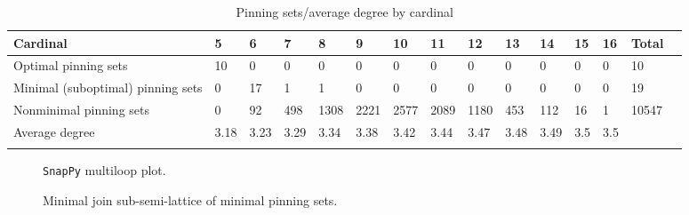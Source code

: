 \documentclass{article}%
\begin{document}
\begin{table}[ht]
	\caption{Pinning sets/average degree by cardinal}
	\centering
	\renewcommand{\arraystretch}{1.5}
	\begin{tabularx}{\textwidth}{lXXXXXXXXXXXXXX}
		\toprule
			Cardinal & 5 & 6 & 7 & 8 & 9 & 10 & 11 & 12 & 13 & 14 & 15 & 16 & Total\\
			\hline
			Optimal pinning sets & 10 & 0 & 0 & 0 & 0 & 0 & 0 & 0 & 0 & 0 & 0 & 0 & 10 \\
			Minimal (suboptimal) pinning sets & 0 & 17 & 1 & 1 & 0 & 0 & 0 & 0 & 0 & 0 & 0 & 0 & 19 \\
			Nonminimal pinning sets & 0 & 92 & 498 & 1308 & 2221 & 2577 & 2089 & 1180 & 453 & 112 & 16 & 1 & 10547 \\
			Average degree & 3.18 & 3.23 & 3.29 & 3.34 & 3.38 & 3.42 & 3.44 & 3.47 & 3.48 & 3.49 & 3.5 & 3.5 &  \\
		\bottomrule \\ 
	\end{tabularx}
\end{table}

\begin{multicols}{2}
\begin{figure}[H]
\centering

\caption{\texttt{SnapPy} multiloop plot.}
\label{fig:tex/img/[[19, 28, 20, 1], [9, 18, 10, 19], [6, 27, 7, 28], [20, 7, 21, 8], [1, 8, 2, 9], [22, 17, 23, 18], [10, 23, 11, 24], [5, 14, 6, 15], [26, 13, 27, 14], [21, 3, 22, 2], [16, 11, 17, 12], [24, 16, 25, 15.svg}
\end{figure}
\columnbreak

\begin{figure}[H]
\centering
\scalebox{0.8}{}
\caption{Minimal join sub-semi-lattice of minimal pinning sets.}
\label{fig:tex/img/[[19, 28, 20, 1], [9, 18, 10, 19], [6, 27, 7, 28], [20, 7, 21, 8], [1, 8, 2, 9], [22, 17, 23, 18], [10, 23, 11, 24], [5, 14, 6, 15], [26, 13, 27, 14], [21, 3, 22, 2], [16, 11, 17, 12], [24, 16, 25, 15.pgf}
\end{figure}
\end{multicols}
\end{document}
